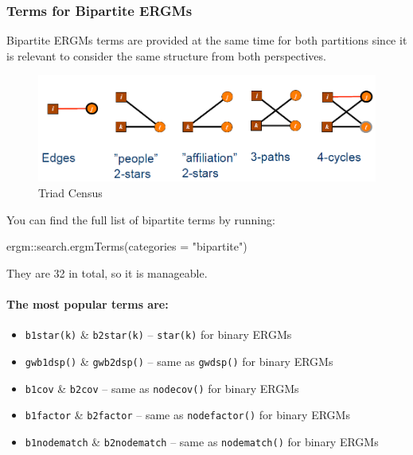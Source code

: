 \documentclass[
]{article}
\newenvironment{Shaded}{\begin{snugshade}}{\end{snugshade}}
\newcommand{\AttributeTok}[1]{\textcolor[rgb]{0.77,0.63,0.00}{#1}}
\newcommand{\FunctionTok}[1]{\textcolor[rgb]{0.00,0.00,0.00}{#1}}
\newcommand{\NormalTok}[1]{#1}
\newcommand{\SpecialCharTok}[1]{\textcolor[rgb]{0.00,0.00,0.00}{#1}}
\newcommand{\StringTok}[1]{\textcolor[rgb]{0.31,0.60,0.02}{#1}}
\begin{document}
\hypertarget{terms-for-bipartite-ergms}{%
\subsubsection{Terms for Bipartite
ERGMs}\label{terms-for-bipartite-ergms}}

Bipartite ERGMs terms are provided at the same time for both partitions
since it is relevant to consider the same structure from both
perspectives.

\begin{figure}
\centering
\includegraphics{bipartite_terms.png}
\caption{Triad Census}
\end{figure}

You can find the full list of bipartite terms by running:

\begin{Shaded}
\begin{Highlighting}[]

\NormalTok{ergm}\SpecialCharTok{::}\FunctionTok{search.ergmTerms}\NormalTok{(}\AttributeTok{categories =} \StringTok{"bipartite"}\NormalTok{)}
\end{Highlighting}
\end{Shaded}

They are 32 in total, so it is manageable.

\hypertarget{the-most-popular-terms-are}{%
\paragraph{The most popular terms
are:}\label{the-most-popular-terms-are}}

\begin{itemize}
\item
  \texttt{b1star(k)} \& \texttt{b2star(k)} -- \texttt{star(k)} for
  binary ERGMs
\item
  \texttt{gwb1dsp()} \& \texttt{gwb2dsp()} -- same as \texttt{gwdsp()}
  for binary ERGMs
\item
  \texttt{b1cov} \& \texttt{b2cov} -- same as \texttt{nodecov()} for
  binary ERGMs
\item
  \texttt{b1factor} \& \texttt{b2factor} -- same as
  \texttt{nodefactor()} for binary ERGMs
\item
  \texttt{b1nodematch} \& \texttt{b2nodematch} -- same as
  \texttt{nodematch()} for binary ERGMs
\end{itemize}
\end{document}

